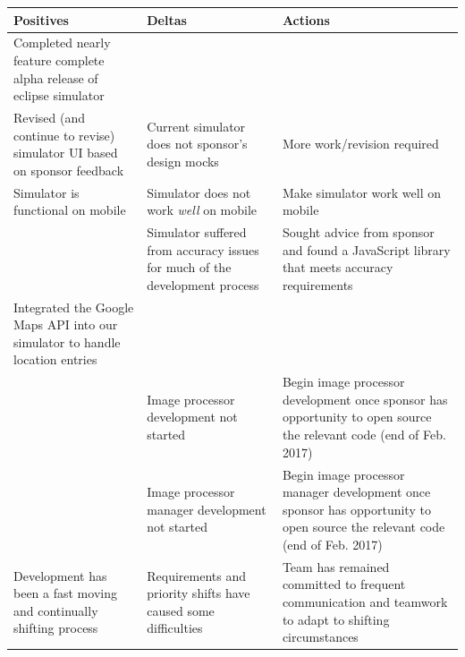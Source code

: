 \documentclass[10pt, onecolumn, draftclsnofoot, letterpaper, compsoc]{IEEEtran}
\begin{document}
\begin{table}[!h]
    \centering
    \begin{tabular}{|p{.3\linewidth}|p{.3\linewidth}|p{.3\linewidth}|}

    \cline{3-3}

    \hline \textbf{Positives} & \textbf{Deltas} & \textbf{Actions} \\ \hline

    Completed nearly feature complete alpha release of eclipse simulator &  &  \\ \hline
    Revised (and continue to revise) simulator UI based on sponsor feedback & Current simulator does not sponsor's design mocks & More work/revision required \\ \hline
	Simulator is functional on mobile & Simulator does not work \textit{well} on mobile & Make simulator work well on mobile \\ \hline
	 & Simulator suffered from accuracy issues for much of the development process & Sought advice from sponsor and found a JavaScript library that meets accuracy requirements \\ \hline
	Integrated the Google Maps API into our simulator to handle location entries & & \\ \hline
     & Image processor development not started & Begin image processor development once sponsor has opportunity to open source the relevant code (end of Feb. 2017) \\ \hline
     & Image processor manager development not started & Begin image processor manager development once sponsor has opportunity to open source the relevant code (end of Feb. 2017) \\ \hline
	Development has been a fast moving and continually shifting process & Requirements and priority shifts have caused some difficulties & Team has remained committed to frequent communication and teamwork to adapt to shifting circumstances \\ \hline

    \end{tabular}
\end{table}
\end{document}
